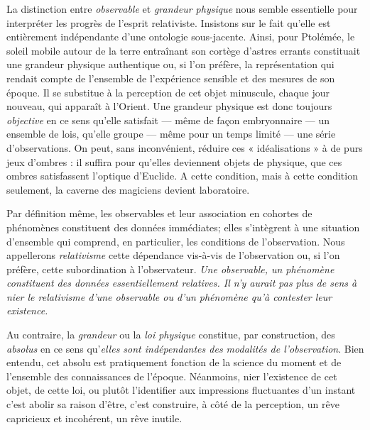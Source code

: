 La distinction entre {\it observable} et {\it grandeur physique} nous semble
essentielle pour interpréter les progrès de l’esprit relativiste. Insistons
sur le fait qu’elle est entièrement indépendante d’une ontologie sous-jacente.
Ainsi, pour Ptolémée, le soleil mobile autour de la terre
entraînant son cortège d’astres errants constituait une grandeur physique
authentique ou, si l’on préfère, la représentation qui rendait compte de
l’ensemble de l’expérience sensible et des mesures de son époque. Il se
substitue à la perception de cet objet minuscule, chaque jour nouveau,
qui apparaît à l'Orient. Une grandeur physique est donc toujours {\it objective}
en ce sens qu’elle satisfait — même de façon embryonnaire — un
ensemble de lois, qu’elle groupe — même pour un temps limité — une
série d’observations. On peut, sans inconvénient, réduire ces « idéalisations »
à de purs jeux d’ombres : il suffira pour qu’elles deviennent
objets de physique, que ces ombres satisfassent l’optique d’Euclide.
A cette condition, mais à cette condition seulement, la caverne des
magiciens devient laboratoire.

Par définition même, les observables et leur association en cohortes
de phénomènes constituent des données immédiates; elles s’intègrent
à une situation d’ensemble qui comprend, en particulier, les conditions
de l’observation. Nous appellerons {\it relativisme} cette dépendance vis-à-vis
de l’observation ou, si l’on préfère, cette subordination à l’observateur.
{\it Une observable, un phénomène constituent des données essentiellement relatives.
Il n’y aurait pas plus de sens à nier le relativisme d’une observable ou
d’un phénomène qu’à contester leur existence.}

Au contraire, la {\it grandeur} ou la {\it loi physique} constitue, par construction,
des {\it absolus} en ce sens qu’{\it elles sont indépendantes des modalités de
l'observation}. Bien entendu, cet absolu est pratiquement fonction de la
science du moment et de l’ensemble des connaissances de l’époque.
Néanmoins, nier l’existence de cet objet, de cette loi, ou plutôt l’identifier
aux impressions fluctuantes d’un instant c’est abolir sa raison d’être,
c’est construire, à côté de la perception, un rêve capricieux et incohérent,
un rêve inutile.

